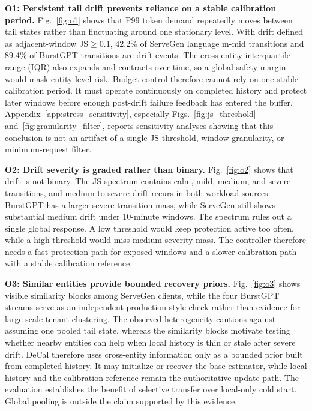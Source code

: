 \documentclass[sigplan,10pt, anonymous]{acmart}
\begin{document}
\textbf{O1: Persistent tail drift prevents reliance on a stable calibration period.}
Fig.~\ref{fig:o1} shows that P99 token demand repeatedly moves between tail states rather than fluctuating around one stationary level. With drift defined as adjacent-window $\mathrm{JS}\ge0.1$, 42.2\% of ServeGen language m-mid transitions and 89.4\% of BurstGPT transitions are drift events. The cross-entity interquartile range (IQR) also expands and contracts over time, so a global safety margin would mask entity-level risk. Budget control therefore cannot rely on one stable calibration period. It must operate continuously on completed history and protect later windows before enough post-drift failure feedback has entered the buffer. Appendix~\ref{app:stress_sensitivity}, especially Figs.~\ref{fig:js_threshold} and~\ref{fig:granularity_filter}, reports sensitivity analyses showing that this conclusion is not an artifact of a single JS threshold, window granularity, or minimum-request filter.

\textbf{O2: Drift severity is graded rather than binary.}
Fig.~\ref{fig:o2} shows that drift is not binary. The JS spectrum contains calm, mild, medium, and severe transitions, and medium-to-severe drift recurs in both workload sources. BurstGPT has a larger severe-transition mass, while ServeGen still shows substantial medium drift under 10-minute windows. The spectrum rules out a single global response. A low threshold would keep protection active too often, while a high threshold would miss medium-severity mass. The controller therefore needs a fast protection path for exposed windows and a slower calibration path with a stable calibration reference.

\textbf{O3: Similar entities provide bounded recovery priors.}
Fig.~\ref{fig:o3} shows visible similarity blocks among ServeGen clients, while the four BurstGPT streams serve as an independent production-style check rather than evidence for large-scale tenant clustering. The observed heterogeneity cautions against assuming one pooled tail state, whereas the similarity blocks motivate testing whether nearby entities can help when local history is thin or stale after severe drift. DeCal therefore uses cross-entity information only as a bounded prior built from completed history. It may initialize or recover the base estimator, while local history and the calibration reference remain the authoritative update path. The evaluation establishes the benefit of selective transfer over local-only cold start. Global pooling is outside the claim supported by this evidence.
\end{document}
